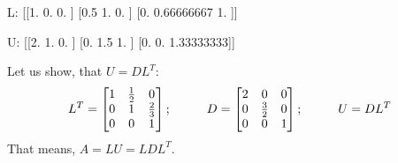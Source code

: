 \documentclass[letterpaper,10pt,english]{jupyterBook}
\begin{document}
\begin{sphinxVerbatim}[commandchars=\\\{\}]
       
  
  
\end{sphinxVerbatim}

\begin{sphinxVerbatim}[commandchars=\\\{\}]
L:
[[1.         0.         0.        ]
 [0.5        1.         0.        ]
 [0.         0.66666667 1.        ]]

U:
[[2.         1.         0.        ]
 [0.         1.5        1.        ]
 [0.         0.         1.33333333]]
\end{sphinxVerbatim}

\sphinxAtStartPar
Let us show, that \(U = DL^T\):
\begin{equation*}
\begin{split}
L^T = 
\begin{bmatrix}
1 & \frac{1}{2} & 0\\
0 & 1 & \frac{2}{3}\\
0 & 0 & 1
\end{bmatrix}
;\hspace{10mm}
D = 
\begin{bmatrix}
2 & 0 & 0\\
0 & \frac{3}{2} & 0\\
0 & 0 & 1
\end{bmatrix}
;\hspace{10mm}
U = DL^T
\end{split}
\end{equation*}
\sphinxAtStartPar
That means, \(A = LU = LDL^T\).
\end{document}
